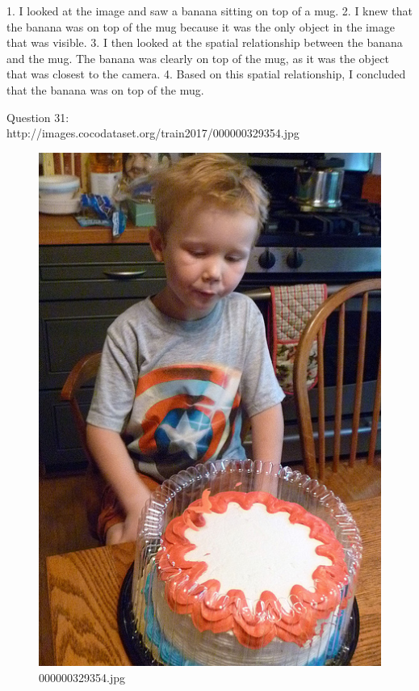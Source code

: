\begin{enumerate}
        1. I looked at the image and saw a banana sitting on top of a mug.
        2. I knew that the banana was on top of the mug because it was the only object in the image that was visible.
        3. I then looked at the spatial relationship between the banana and the mug. The banana was clearly on top of the mug, as it was the object that was closest to the camera.
        4. Based on this spatial relationship, I concluded that the banana was on top of the mug.
    \end{enumerate}
    Question 31:\\http://images.cocodataset.org/train2017/000000329354.jpg
    \begin{figure}[h]
        \centering
        \includegraphics[width=0.8\linewidth]{../image set/easy/000000329354.jpg}
        \caption{000000329354.jpg}
    \end{figure}
